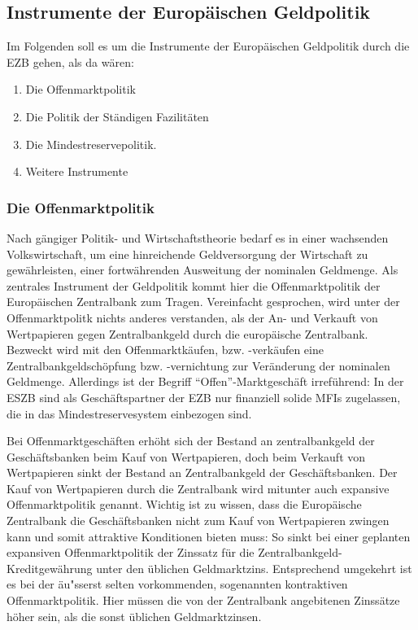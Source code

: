 \documentclass[
    onecolumn,
    a4paper,
    abstracton,
    parskip=half
    ,final
    ]{scrartcl}
\begin{document}
\subsection{Instrumente der Europ{\"a}ischen Geldpolitik}

Im Folgenden soll es um die Instrumente der Europ{\"a}ischen Geldpolitik durch die EZB gehen, als da w{\"a}ren:
\begin{enumerate}
  \item{Die Offenmarktpolitik}
  \item{Die Politik der St{\"a}ndigen Fazilit{\"a}ten}
  \item{Die Mindestreservepolitik.}
  \item{Weitere Instrumente}
\end{enumerate}

\subsubsection{Die Offenmarktpolitik}
Nach g{\"a}ngiger Politik- und Wirtschaftstheorie bedarf es in einer wachsenden Volkswirtschaft, um eine hinreichende Geldversorgung der Wirtschaft zu gew{\"a}hrleisten, einer fortw{\"a}hrenden Ausweitung der nominalen Geldmenge. Als zentrales Instrument der Geldpolitik kommt hier die Offenmarktpolitik der Europ{\"a}ischen Zentralbank zum Tragen.
Vereinfacht gesprochen, wird unter der Offenmarktpolitk nichts anderes verstanden, als der An- und Verkauft von Wertpapieren gegen Zentralbankgeld durch die europ{\"a}ische Zentralbank. Bezweckt wird mit den Offenmarktk{\"a}ufen, bzw. -verk{\"a}ufen eine Zentralbankgeldsch{\"o}pfung bzw. -vernichtung zur Ver{\"a}nderung der nominalen Geldmenge. Allerdings ist der Begriff "`Offen"'-Marktgesch{\"a}ft irref{\"u}hrend: In der ESZB sind als Gesch{\"a}ftspartner der EZB nur finanziell solide MFIs zugelassen, die in das Mindestreservesystem einbezogen sind.

Bei Offenmarktgesch{\"a}ften erh{\"o}ht sich der Bestand an zentralbankgeld der Gesch{\"a}ftsbanken beim Kauf von Wertpapieren, doch beim Verkauft von Wertpapieren sinkt der Bestand an Zentralbankgeld der Gesch{\"a}ftsbanken. Der Kauf von Wertpapieren durch die Zentralbank wird mitunter auch expansive Offenmarktpolitik genannt.
Wichtig ist zu wissen, dass die Europ{\"a}ische Zentralbank die Gesch{\"a}ftsbanken nicht zum Kauf von Wertpapieren zwingen kann und somit attraktive Konditionen bieten muss: So sinkt bei einer geplanten expansiven Offenmarktpolitik der Zinssatz f{\"u}r die Zentralbankgeld-Kreditgew{\"a}hrung unter den {\"u}blichen Geldmarktzins. Entsprechend umgekehrt ist es bei der {\"a}u{"ss}erst selten vorkommenden, sogenannten kontraktiven Offenmarktpolitik. Hier m{\"u}ssen die von der Zentralbank angebitenen Zinss{\"a}tze h{\"o}her sein, als die sonst {\"u}blichen Geldmarktzinsen.
\end{document}
